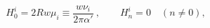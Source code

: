 \begin{equation}
 H^i_0 = 2 R w \mu_i \equiv \frac{w \nu_i}{2 \pi \alpha'} ~, 
 \qquad H^i_n = 0 \quad (n \neq 0 ) ,
\end{equation}

